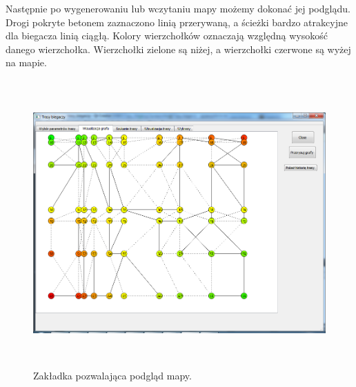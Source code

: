 \documentclass[12pt,a4paper]{article}
\begin{document}
Następnie po wygenerowaniu lub wczytaniu mapy możemy dokonać jej podglądu.
Drogi pokryte betonem zaznaczono linią przerywaną, a ścieżki bardzo atrakcyjne dla biegacza linią ciągłą.
Kolory wierzchołków oznaczają względną wysokość danego wierzchołka. Wierzchołki zielone są niżej, a wierzchołki czerwone są wyżej na mapie.
\begin{figure}[!h]
	\centering
	\includegraphics[height=110mm]{./ilustracje/screen2.png}
	\caption{Zakładka pozwalająca podgląd mapy.}
\end{figure}
\end{document}
